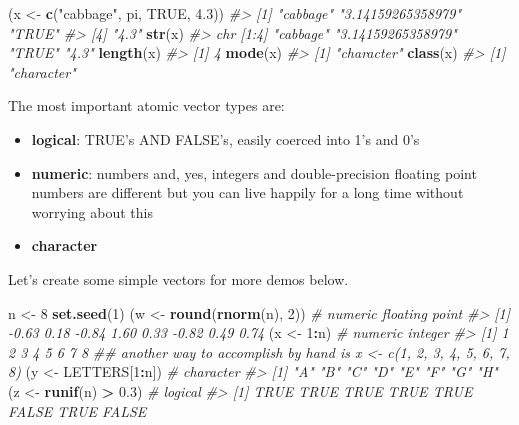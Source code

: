 \documentclass[
]{book}
\newenvironment{Shaded}{\begin{snugshade}}{\end{snugshade}}
\newcommand{\CommentTok}[1]{\textcolor[rgb]{0.56,0.35,0.01}{\textit{#1}}}
\newcommand{\DecValTok}[1]{\textcolor[rgb]{0.00,0.00,0.81}{#1}}
\newcommand{\FloatTok}[1]{\textcolor[rgb]{0.00,0.00,0.81}{#1}}
\newcommand{\KeywordTok}[1]{\textcolor[rgb]{0.13,0.29,0.53}{\textbf{#1}}}
\newcommand{\NormalTok}[1]{#1}
\newcommand{\OperatorTok}[1]{\textcolor[rgb]{0.81,0.36,0.00}{\textbf{#1}}}
\newcommand{\OtherTok}[1]{\textcolor[rgb]{0.56,0.35,0.01}{#1}}
\newcommand{\StringTok}[1]{\textcolor[rgb]{0.31,0.60,0.02}{#1}}
\providecommand{\tightlist}{%
  \setlength{\itemsep}{0pt}\setlength{\parskip}{0pt}}
\begin{document}
\begin{Shaded}
\begin{Highlighting}[]
\NormalTok{(x <-}\StringTok{ }\KeywordTok{c}\NormalTok{(}\StringTok{"cabbage"}\NormalTok{, pi, }\OtherTok{TRUE}\NormalTok{, }\FloatTok{4.3}\NormalTok{))}
\CommentTok{#> [1] "cabbage"          "3.14159265358979" "TRUE"            }
\CommentTok{#> [4] "4.3"}
\KeywordTok{str}\NormalTok{(x)}
\CommentTok{#>  chr [1:4] "cabbage" "3.14159265358979" "TRUE" "4.3"}
\KeywordTok{length}\NormalTok{(x)}
\CommentTok{#> [1] 4}
\KeywordTok{mode}\NormalTok{(x)}
\CommentTok{#> [1] "character"}
\KeywordTok{class}\NormalTok{(x)}
\CommentTok{#> [1] "character"}
\end{Highlighting}
\end{Shaded}

The most important atomic vector types are:

\begin{itemize}
\tightlist
\item
  \textbf{logical}: TRUE's AND FALSE's, easily coerced into 1's and 0's
\item
  \textbf{numeric}: numbers and, yes, integers and double-precision floating point numbers are different but you can live happily for a long time without worrying about this
\item
  \textbf{character}
\end{itemize}

Let's create some simple vectors for more demos below.

\begin{Shaded}
\begin{Highlighting}[]
\NormalTok{n <-}\StringTok{ }\DecValTok{8}
\KeywordTok{set.seed}\NormalTok{(}\DecValTok{1}\NormalTok{)}
\NormalTok{(w <-}\StringTok{ }\KeywordTok{round}\NormalTok{(}\KeywordTok{rnorm}\NormalTok{(n), }\DecValTok{2}\NormalTok{)) }\CommentTok{# numeric floating point}
\CommentTok{#> [1] -0.63  0.18 -0.84  1.60  0.33 -0.82  0.49  0.74}
\NormalTok{(x <-}\StringTok{ }\DecValTok{1}\OperatorTok{:}\NormalTok{n) }\CommentTok{# numeric integer}
\CommentTok{#> [1] 1 2 3 4 5 6 7 8}
\CommentTok{## another way to accomplish by hand is x <- c(1, 2, 3, 4, 5, 6, 7, 8)}
\NormalTok{(y <-}\StringTok{ }\NormalTok{LETTERS[}\DecValTok{1}\OperatorTok{:}\NormalTok{n]) }\CommentTok{# character}
\CommentTok{#> [1] "A" "B" "C" "D" "E" "F" "G" "H"}
\NormalTok{(z <-}\StringTok{ }\KeywordTok{runif}\NormalTok{(n) }\OperatorTok{>}\StringTok{ }\FloatTok{0.3}\NormalTok{) }\CommentTok{# logical}
\CommentTok{#> [1]  TRUE  TRUE  TRUE  TRUE  TRUE FALSE  TRUE FALSE}
\end{Highlighting}
\end{Shaded}
\end{document}
